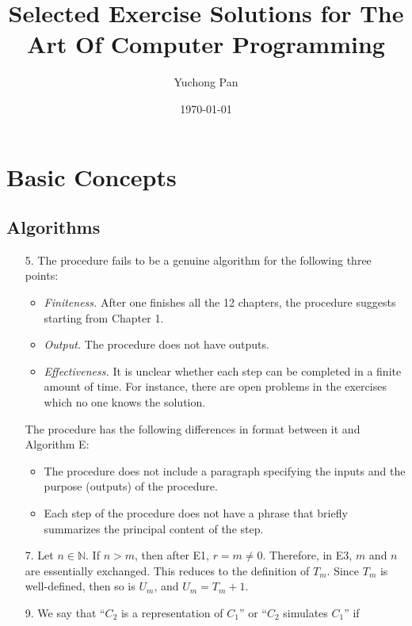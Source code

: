 \documentclass[letterpaper, reqno,11pt]{article}
\newcommand{\NN}{\mathbb{N}}
\begin{document}
\title{Selected Exercise Solutions for The Art Of Computer Programming}
\author{Yuchong Pan}
\date{\today}
\newtheorem{thm}{Theorem}
\maketitle
%

\section{Basic Concepts}

\subsection{Algorithms}

\begin{enumerate}
    \item[5.] The procedure fails to be a genuine algorithm for the following three points:
    \begin{itemize}
        \item \emph{Finiteness.} After one finishes all the 12 chapters, the procedure suggests starting from Chapter 1.
        \item \emph{Output.} The procedure does not have outputs.
        \item \emph{Effectiveness.} It is unclear whether each step can be completed in a finite amount of time. For instance, there are open problems in the exercises which no one knows the solution.
    \end{itemize}
    The procedure has the following differences in format between it and Algorithm E:
    \begin{itemize}
        \item The procedure does not include a paragraph specifying the inputs and the purpose (outputs) of the procedure.
        \item Each step of the procedure does not have a phrase that briefly summarizes the principal content of the step.
    \end{itemize}
    \item[7.] Let $n \in \NN$. If $n > m$, then after E1, $r = m \neq 0$. Therefore, in E3, $m$ and $n$ are essentially exchanged. This reduces to the definition of $T_m$. Since $T_m$ is well-defined, then so is $U_m$, and $U_m = T_m + 1$.
    \item[9.] We say that ``$C_2$ is a representation of $C_1$'' or ``$C_2$ simulates $C_1$'' if
    \begin{itemize}

\end{itemize}
\end{enumerate}
\end{document}
